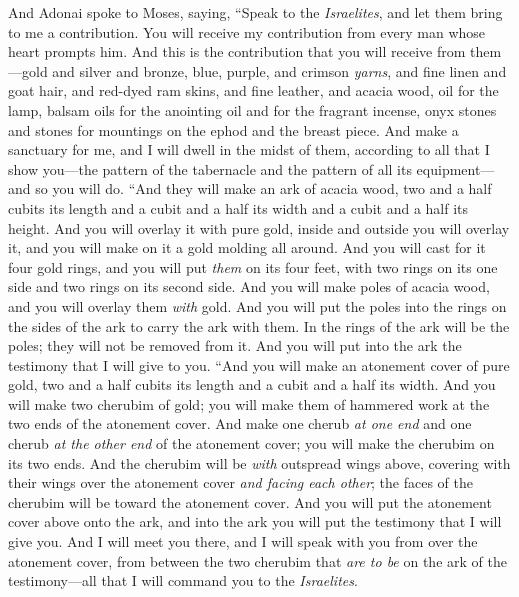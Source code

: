 \begin{biblechapter} %
 And Adonai spoke to Moses, saying,
\verse “Speak to the \textit{Israelites}, and let them bring to me a contribution. You will receive my contribution from every man whose heart prompts him.
\verse And this is the contribution that you will receive from them—gold and silver and bronze,
\verse blue, purple, and crimson \textit{yarns}, and fine linen and goat hair,
\verse and red-dyed ram skins, and fine leather, and acacia wood,
\verse oil for the lamp, balsam oils for the anointing oil and for the fragrant incense,
\verse onyx stones and stones for mountings on the ephod and the breast piece.
\verse And make a sanctuary for me, and I will dwell in the midst of them,
\verse according to all that I show you—the pattern of the tabernacle and the pattern of all its equipment—and so you will do.
 “And they will make an ark of acacia wood, two and a half cubits its length and a cubit and a half its width and a cubit and a half its height.
\verse And you will overlay it with pure gold, inside and outside you will overlay it, and you will make on it a gold molding all around.
\verse And you will cast for it four gold rings, and you will put \textit{them} on its four feet, with two rings on its one side and two rings on its second side.
\verse And you will make poles of acacia wood, and you will overlay them \textit{with} gold.
\verse And you will put the poles into the rings on the sides of the ark to carry the ark with them.
\verse In the rings of the ark will be the poles; they will not be removed from it.
\verse And you will put into the ark the testimony that I will give to you.
\verse “And you will make an atonement cover of pure gold, two and a half cubits its length and a cubit and a half its width.
\verse And you will make two cherubim of gold; you will make them of hammered work at the two ends of the atonement cover.
\verse And make one cherub \textit{at one end} and one cherub \textit{at the other end} of the atonement cover; you will make the cherubim on its two ends.
\verse And the cherubim will be \textit{with} outspread wings above, covering with their wings over the atonement cover \textit{and facing each other}; the faces of the cherubim will be toward the atonement cover.
\verse And you will put the atonement cover above onto the ark, and into the ark you will put the testimony that I will give you.
\verse And I will meet you there, and I will speak with you from over the atonement cover, from between the two cherubim that \textit{are to be} on the ark of the testimony—all that I will command you to the \textit{Israelites}.

\end{biblechapter}
